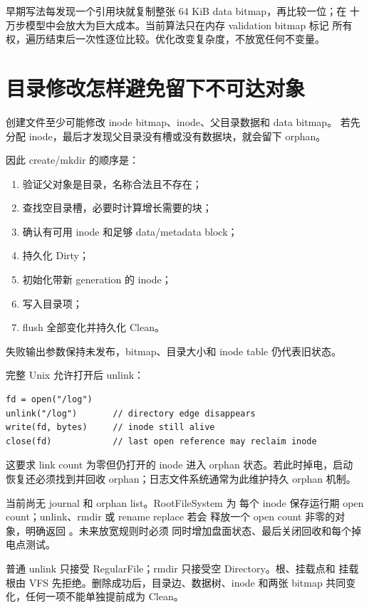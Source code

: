 早期写法每发现一个引用块就复制整张 64 KiB data bitmap，再比较一位；在
十万步模型中会放大为巨大成本。当前算法只在内存 validation bitmap 标记
所有权，遍历结束后一次性逐位比较。优化改变复杂度，不放宽任何不变量。

\section{目录修改怎样避免留下不可达对象}
创建文件至少可能修改 inode bitmap、inode、父目录数据和 data bitmap。
若先分配 inode，最后才发现父目录没有槽或没有数据块，就会留下 orphan。

因此 create/mkdir 的顺序是：

\begin{enumerate}
  \item 验证父对象是目录，名称合法且不存在；
  \item 查找空目录槽，必要时计算增长需要的块；
  \item 确认有可用 inode 和足够 data/metadata block；
  \item 持久化 Dirty；
  \item 初始化带新 generation 的 inode；
  \item 写入目录项；
  \item flush 全部变化并持久化 Clean。
\end{enumerate}

失败输出参数保持未发布，bitmap、目录大小和 inode table 仍代表旧状态。

完整 Unix 允许打开后 unlink：

\begin{lstlisting}[caption={成熟 Unix 中名字和打开生命周期分离}]
fd = open("/log")
unlink("/log")       // directory edge disappears
write(fd, bytes)     // inode still alive
close(fd)            // last open reference may reclaim inode
\end{lstlisting}

这要求 link count 为零但仍打开的 inode 进入 orphan 状态。若此时掉电，启动
恢复还必须找到并回收 orphan；日志文件系统通常为此维护持久 orphan 机制。

当前尚无 journal 和 orphan list。RootFileSystem 为
每个 inode 保存运行期 open count；unlink、rmdir 或 rename replace 若会
释放一个 open count 非零的对象，明确返回 。未来放宽规则时必须
同时增加盘面状态、最后关闭回收和每个掉电点测试。

普通 unlink 只接受 RegularFile；rmdir 只接受空 Directory。根、挂载点和
挂载根由 VFS 先拒绝。删除成功后，目录边、数据树、inode 和两张 bitmap
共同变化，任何一项不能单独提前成为 Clean。

